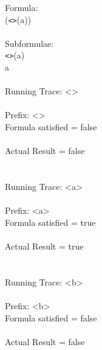 Formula:\\
(\texttt{\textless \textgreater}(a))\\
\\
Subformulae:\\
\texttt{\textless \textgreater}(a)\\
a\\
\\
Running Trace: \textless \textgreater\\
\\
  Prefix: \textless \textgreater\\
  Formula satisfied = false\\
\\
  Actual Result = false\\
\\
\\
Running Trace: \textless a\textgreater\\
\\
  Prefix: \textless a\textgreater\\
  Formula satisfied = true\\
\\
  Actual Result = true\\
\\
\\
Running Trace: \textless b\textgreater\\
\\
  Prefix: \textless b\textgreater\\
  Formula satisfied = false\\
\\
  Actual Result = false\\

